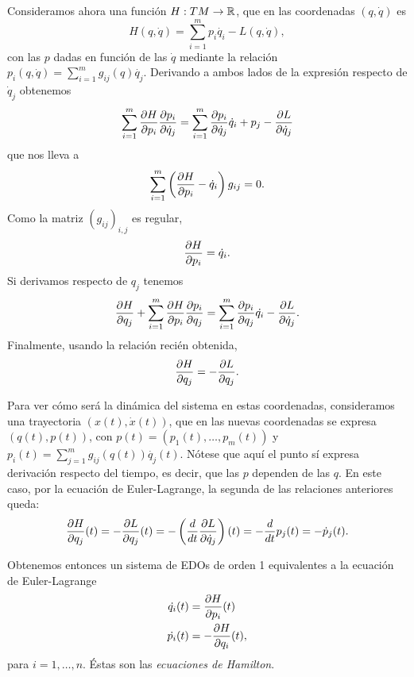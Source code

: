   Consideramos ahora una función $H:TM\rightarrow \mathbb{R}$, que en las coordenadas $(q,\dot{q})$ es 
  \begin{equation*}
    H(q,\dot{q})=\sum_{i=1}^m p_i \dot{q_i} - L(q,\dot{q}),
  \end{equation*}
  con las $p$ dadas en función de las $\dot{q}$ mediante la relación $p_i(q,\dot{q})=\sum_{i=1}^m g_{ij}(q) \dot{q_j}$. Derivando a ambos lados de la expresión respecto de $\dot{q}_j$ obtenemos
  \begin{equation*}
    \sum_{i=1}^m \frac{\partial H}{\partial p_i}\frac{\partial p_i}{\partial \dot{q}_j}=\sum_{i=1}^m \frac{\partial p_i}{\partial \dot{q}_j}\dot{q}_i + p_j - \frac{\partial L}{\partial \dot{q}_j}
  \end{equation*}
  que nos lleva a
  \begin{equation*}
    \sum_{i=1}^m \left( \frac{\partial H}{\partial p_i}-\dot{q}_i \right)g_{ij}=0.
  \end{equation*}
  Como la matriz $(g_{ij})_{i,j}$ es regular,
  \begin{equation*}
    \frac{\partial H}{\partial p_i}=\dot{q}_i.
  \end{equation*}
  Si derivamos respecto de $q_j$ tenemos
  \begin{equation*}
    \frac{\partial H}{\partial q_j}+\sum_{i=1}^m \frac{\partial H}{\partial p_i}\frac{\partial p_i}{\partial q_j}= \sum_{i=1}^m \frac{\partial p_i}{\partial q_j} \dot{q_i} - \frac{\partial L}{\partial \dot{q}_j}.
  \end{equation*}
  Finalmente, usando la relación recién obtenida,
  \begin{equation*}
    \frac{\partial H}{\partial q_j}=-\frac{\partial L}{\partial q_j}.
  \end{equation*}

  Para ver cómo será la dinámica del sistema en estas coordenadas, consideramos una trayectoria $(x(t),\dot{x}(t))$, que en las nuevas coordenadas se expresa $(q(t),p(t))$, con $p(t)=(p_1(t),\dots,p_m(t))$ y $p_i(t)=\sum_{j=1}^m g_{ij}(q(t)) \dot{q_j}(t)$. Nótese que aquí el punto sí expresa derivación respecto del tiempo, es decir, que las $p$ dependen de las $q$. En este caso, por la ecuación de Euler-Lagrange, la segunda de las relaciones anteriores queda:
  \begin{equation*}
    \frac{\partial H}{\partial q_j}(t)=-\frac{\partial L}{\partial q_j}(t)=-\left(\frac{d}{dt} \frac{\partial L}{\partial \dot{q}_j} \right)(t)= - \frac{d}{dt}p_j(t) = -\dot{p}_j(t).
  \end{equation*}
  
  Obtenemos entonces un sistema de EDOs de orden 1 equivalentes a la ecuación de Euler-Lagrange
  \begin{align*}
    \dot{q_i}(t)&=\frac{\partial H}{\partial p_i}(t) \\
      \dot{p_i}(t)&=-\frac{\partial H}{\partial q_i}(t),
  \end{align*}
  para $i=1,\dots,n$. Éstas son las \emph{ecuaciones de Hamilton}.
  
